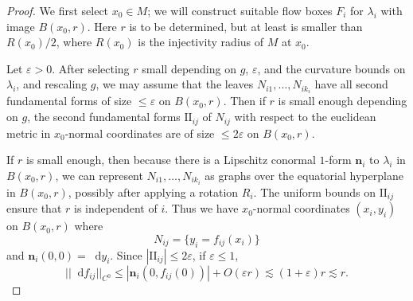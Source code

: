 \documentclass[reqno,11pt]{amsart}
\newcommand*\dif{\mathop{}\!\mathrm{d}}
\newcommand{\Two}{\mathrm{I\!I}}
\newcommand{\normal}{\mathbf n}
\theoremstyle{definition}
\numberwithin{equation}{section}
\begin{document}
\begin{proof}
We first select $x_0 \in M$; we will construct suitable flow boxes $F_i$ for $\lambda_i$ with image $B(x_0, r)$.
Here $r$ is to be determined, but at least is smaller than $R(x_0)/2$, where $R(x_0)$ is the injectivity radius of $M$ at $x_0$.

Let $\varepsilon > 0$.
After selecting $r$ small depending on $g$, $\varepsilon$, and the curvature bounds on $\lambda_i$, and rescaling $g$, we may assume that the leaves $N_{i1}, \dots, N_{ik_i}$ have all second fundamental forms of size $\leq \varepsilon$ on $B(x_0, r)$.
Then if $r$ is small enough depending on $g$, the second fundamental forms $\Two_{ij}$ of $N_{ij}$ with respect to the euclidean metric in $x_0$-normal coordinates are of size $\leq 2\varepsilon$ on $B(x_0, r)$.

If $r$ is small enough, then because there is a Lipschitz conormal $1$-form $\normal_i$ to $\lambda_i$ in $B(x_0, r)$, we can represent $N_{i1}, \dots, N_{ik_i}$ as graphs over the equatorial hyperplane in $B(x_0, r)$, possibly after applying a rotation $R_i$.
The uniform bounds on $\Two_{ij}$ ensure that $r$ is independent of $i$.
Thus we have $x_0$-normal coordinates $(x_i, y_i)$ on $B(x_0, r)$ where
$$N_{ij} = \{y_i = f_{ij}(x_i)\}$$
and $\normal_i(0, 0) = \dif y_i$.
Since $|\Two_{ij}| \leq 2\varepsilon$, if $\varepsilon \leq 1$,
\begin{equation}\label{bound on derivatives}
||\dif f_{ij}||_{C^0} \leq |\normal_i(0, f_{ij}(0))| + O(\varepsilon r) \lesssim (1 + \varepsilon) r \lesssim r.
\end{equation}


\end{proof}
\end{document}
